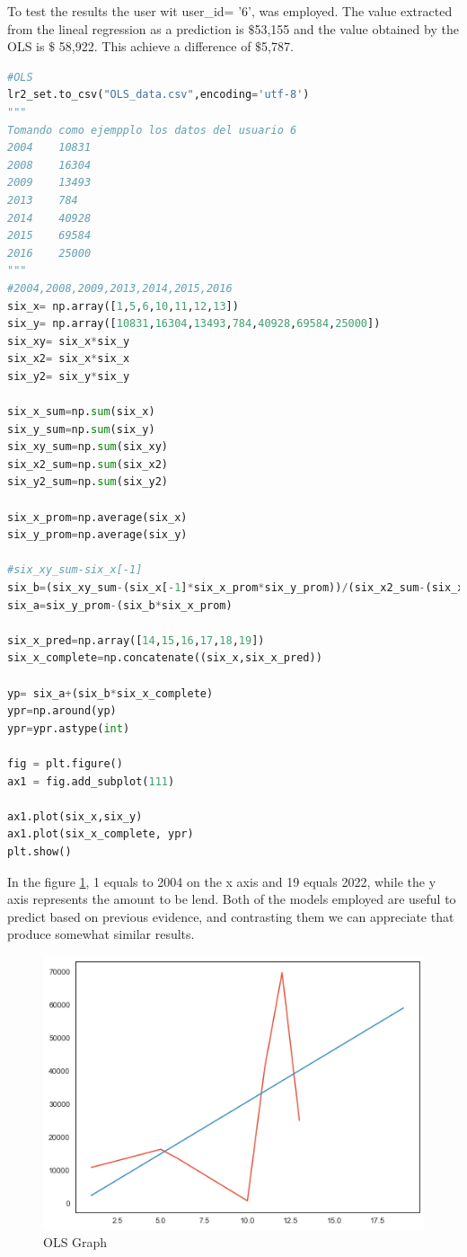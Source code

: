 \documentclass[a4paper,12pt]{article}
\begin{document}
To test the results the user wit user\_id= '6', was employed. The value extracted from the lineal regression as a prediction is $\$$53,155 and the value obtained by the OLS is $\$$ 58,922. This achieve a difference of $\$$5,787.\vspace{3mm}

\begin{lstlisting}[language=python,caption = {OLS}]
#OLS
lr2_set.to_csv("OLS_data.csv",encoding='utf-8')
"""
Tomando como ejempplo los datos del usuario 6
2004	10831
2008	16304
2009	13493
2013	784
2014	40928
2015	69584
2016	25000
"""
#2004,2008,2009,2013,2014,2015,2016
six_x= np.array([1,5,6,10,11,12,13])
six_y= np.array([10831,16304,13493,784,40928,69584,25000])
six_xy= six_x*six_y
six_x2= six_x*six_x
six_y2= six_y*six_y

six_x_sum=np.sum(six_x)
six_y_sum=np.sum(six_y)
six_xy_sum=np.sum(six_xy)
six_x2_sum=np.sum(six_x2)
six_y2_sum=np.sum(six_y2)

six_x_prom=np.average(six_x)
six_y_prom=np.average(six_y)

#six_xy_sum-six_x[-1]
six_b=(six_xy_sum-(six_x[-1]*six_x_prom*six_y_prom))/(six_x2_sum-(six_x[-1]*six_x_prom*six_x_prom))
six_a=six_y_prom-(six_b*six_x_prom)

six_x_pred=np.array([14,15,16,17,18,19])
six_x_complete=np.concatenate((six_x,six_x_pred))

yp= six_a+(six_b*six_x_complete)
ypr=np.around(yp)
ypr=ypr.astype(int)

fig = plt.figure()
ax1 = fig.add_subplot(111)

ax1.plot(six_x,six_y)
ax1.plot(six_x_complete, ypr)
plt.show()
\end{lstlisting}\newpage

In the figure \ref{fig:OLS_graph}, 1 equals to 2004 on the x axis and 19 equals 2022, while the y axis represents the amount to be lend. Both of the models employed are useful to predict based on previous evidence, and contrasting them we can appreciate that produce somewhat similar results.


\begin{figure}[h!]
    \centering
    \includegraphics[scale=0.8]{Images/OLS_graph.png}
    \caption{OLS Graph}
    \label{fig:OLS_graph}
\end{figure}
\end{document}
